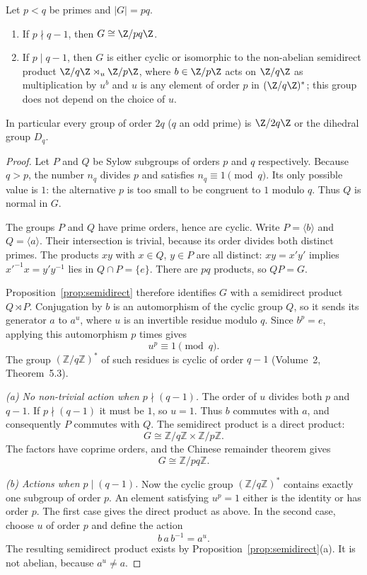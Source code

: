 \begin{theorem}\label{thm:pq}
Let $p<q$ be primes and $|G|=pq$.
\begin{enumerate}[label=(\alph*)]
\item If $p\nmid q-1$, then $G\cong\Z/pq\Z$.
\item If $p\mid q-1$, then $G$ is either cyclic or isomorphic to the non-abelian semidirect product $\Z/q\Z\rtimes_u\Z/p\Z$, where $b\in\Z/p\Z$ acts on $\Z/q\Z$ as multiplication by $u^b$ and $u$ is any element of order $p$ in $(\Z/q\Z)^*$; this group does not depend on the choice of $u$.
\end{enumerate}
In particular every group of order $2q$ ($q$ an odd prime) is $\Z/2q\Z$ or the dihedral group $D_q$.
\end{theorem}
\begin{proof}
Let $P$ and $Q$ be Sylow subgroups of orders
$p$ and $q$ respectively. Because $q>p$,
the number $n_q$ divides $p$ and satisfies
$n_q\equiv1\pmod q$. Its only possible
value is $1$: the alternative $p$ is too
small to be congruent to $1$ modulo $q$.
Thus $Q$ is normal in $G$.

The groups $P$ and $Q$ have prime orders, hence
are cyclic. Write $P=\langle b\rangle$ and
$Q=\langle a\rangle$. Their intersection is
trivial, because its order divides both
distinct primes. The products $xy$ with
$x\in Q$, $y\in P$ are all distinct:
$xy=x'y'$ implies $x'^{-1}x=y'y^{-1}$
lies in $Q\cap P=\{e\}$.
There are $pq$ products, so $QP=G$.

Proposition~\ref{prop:semidirect} therefore
identifies $G$ with a semidirect product
$Q\rtimes P$. Conjugation by $b$
is an automorphism of the cyclic group $Q$,
so it sends its generator $a$ to $a^u$,
where $u$ is an invertible residue modulo $q$.
Since $b^p=e$, applying this automorphism
$p$ times gives
\[
u^p\equiv1\pmod q.
\]
The group $(\mathbb Z/q\mathbb Z)^*$ of such
residues is cyclic of order $q-1$ (Volume~2, Theorem~5.3).

\emph{(a) No non-trivial action when
$p\nmid(q-1)$.}
The order of $u$ divides both $p$ and
$q-1$. If $p\nmid(q-1)$ it must be $1$,
so $u=1$. Thus $b$ commutes with $a$,
and consequently $P$ commutes with $Q$.
The semidirect product is a direct product:
\[
G\cong\mathbb Z/q\mathbb Z\times
\mathbb Z/p\mathbb Z.
\]
The factors have coprime orders, and the
Chinese remainder theorem gives
\[
\boxed{G\cong\mathbb Z/pq\mathbb Z}.
\]

\emph{(b) Actions when $p\mid(q-1)$.}
Now the cyclic group $(\mathbb Z/q\mathbb Z)^*$
contains exactly one subgroup of order $p$.
An element satisfying $u^p=1$ either
is the identity or has order $p$.
The first case gives the direct product as
above. In the second case, choose $u$ of
order $p$ and define the action
\[
b\,a\,b^{-1}=a^u.
\]
The resulting semidirect product exists
by Proposition~\ref{prop:semidirect}(a).
It is not abelian, because $a^u\ne a$.


\end{proof}
